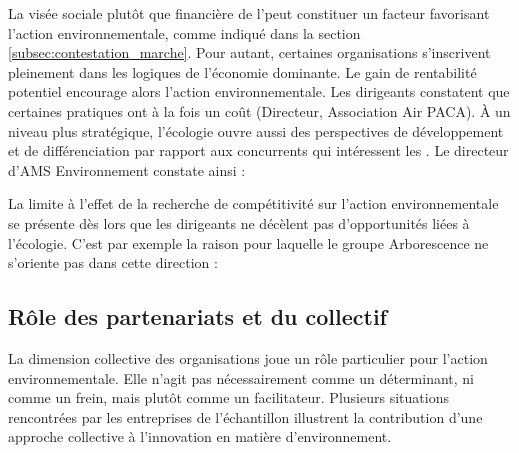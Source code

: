         La visée sociale plutôt que financière de l'\ess peut constituer un facteur favorisant l'action environnementale, comme indiqué dans la section \ref{subsec:contestation_marche}. Pour autant, certaines organisations s'inscrivent pleinement dans les logiques de l'économie dominante. Le gain de rentabilité potentiel encourage alors l'action environnementale. Les dirigeants constatent que certaines pratiques ont à la fois un coût  (Directeur, Association Air PACA). À un niveau plus stratégique, l'écologie ouvre aussi des perspectives de développement et de différenciation par rapport aux concurrents qui intéressent les \oess. Le directeur d'AMS Environnement constate ainsi :
        \begin{quotation}
        \end{quotation}

        La limite à l'effet de la recherche de compétitivité sur l'action environnementale se présente dès lors que les dirigeants ne décèlent pas d'opportunités liées à l'écologie. C'est par exemple la raison pour laquelle le groupe Arborescence ne s'oriente pas dans cette direction :
        \begin{quotation}
        \end{quotation}

    \subsection{Rôle des partenariats et du collectif}
        \label{av_part}

    La dimension collective des organisations joue un rôle particulier pour l'action environnementale. Elle n'agit pas nécessairement comme un déterminant, ni comme un frein, mais plutôt comme un facilitateur. Plusieurs situations rencontrées par les entreprises de l'échantillon illustrent la contribution d'une approche collective à l'innovation en matière d'environnement.


